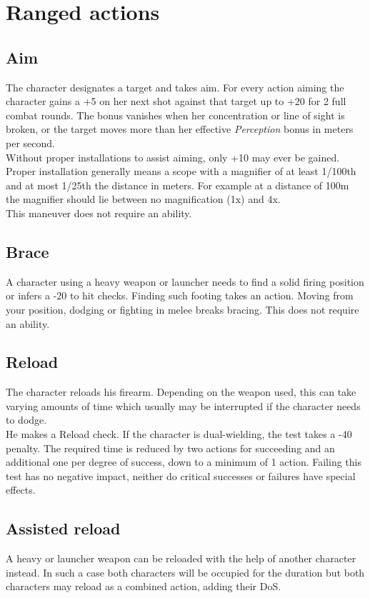 \section{Ranged actions}
\subsection*{Aim}
The character designates a target and takes aim. For every action aiming the character gains a +5 on her next shot against that target up to +20 for 2 full combat rounds. The bonus vanishes when her concentration or line of sight is broken, or the target moves more than her effective \emph{Perception} bonus in meters per second.\\
Without proper installations to assist aiming, only +10 may ever be gained. Proper installation generally means a scope with a magnifier of at least 1/100th and at most 1/25th the distance in meters. For example at a distance of 100m the magnifier should lie between no magnification (1x) and 4x.\\
This maneuver does not require an ability.
\subsection*{Brace}
A character using a heavy weapon or launcher needs to find a solid firing position or infers a -20 to hit checks. Finding such footing takes an action. Moving from your position, dodging or fighting in melee breaks bracing. This does not require an ability.
\subsection*{Reload}
The character reloads his firearm. Depending on the weapon used, this can take varying amounts of time which usually may be interrupted if the character needs to dodge.\\
He makes a Reload check. If the character is dual-wielding, the test takes a -40 penalty. The required time is reduced by two actions for succeeding and an additional one per degree of success, down to a minimum of 1 action. Failing this test has no negative impact, neither do critical successes or failures have special effects.
\subsection*{Assisted reload}
A heavy or launcher weapon can be reloaded with the help of another character instead. In such a case both characters will be occupied for the duration but both characters may reload as a combined action, adding their DoS.
